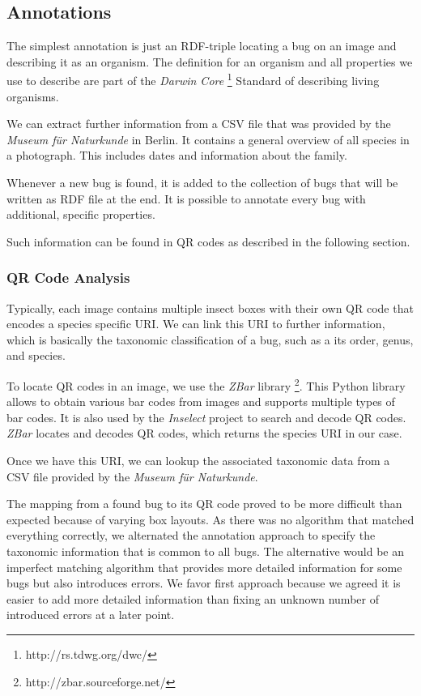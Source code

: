 \subsection{Annotations}
The simplest annotation is just an RDF-triple locating a bug on an image and describing it as an organism. 
The definition for an organism and all properties we use to describe are part of the \emph{Darwin Core} \footnote{http://rs.tdwg.org/dwc/} Standard of describing living organisms.

We can extract further information from a CSV file that was provided by the \emph{Museum für Naturkunde} in Berlin.
It contains a general overview of all species in a photograph.
This includes dates and information about the family.

Whenever a new bug is found, it is added to the collection of bugs that will be written as RDF file at the end.
It is possible to annotate every bug with additional, specific properties.

Such information can be found in QR codes as described in the following section.

\subsubsection{QR Code Analysis}

Typically, each image contains multiple insect boxes with their own QR code that encodes a species specific URI.
We can link this URI to further information, which is basically the taxonomic classification of a bug, such as a its order, genus, and species.

To locate QR codes in an image, we use the \emph{ZBar} library \footnote{http://zbar.sourceforge.net/}.
This Python library allows to obtain various bar codes from images and supports multiple types of bar codes.
It is also used by the \emph{Inselect} project to search and decode QR codes.
\emph{ZBar} locates and decodes QR codes, which returns the species URI in our case.

Once we have this URI, we can lookup the associated taxonomic data from a CSV file provided by the \emph{Museum für Naturkunde}.

The mapping from a found bug to its QR code proved to be more difficult than expected because of varying box layouts.
As there was no algorithm that matched everything correctly, we alternated the annotation approach to specify the taxonomic information that is common to all bugs.
The alternative would be an imperfect matching algorithm that  provides more detailed information for some bugs but also introduces errors.
We favor first approach because we agreed it is easier to add more detailed information than fixing an unknown number of introduced errors at a later point.


